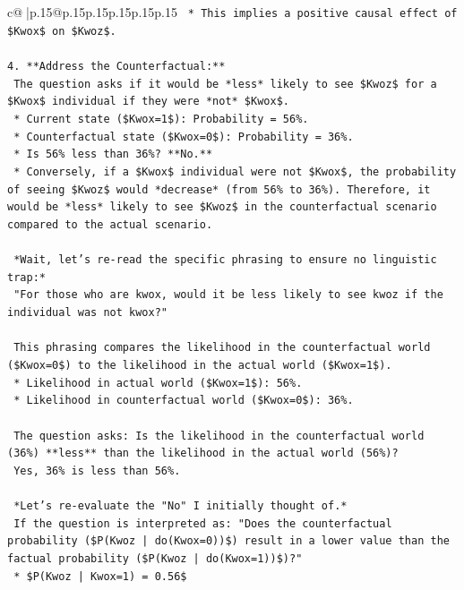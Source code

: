 \documentclass{article}
\begin{document}
{\begin{supertabular}{c@{$\;$}|p{.15\linewidth}@{}p{.15\linewidth}p{.15\linewidth}p{.15\linewidth}p{.15\linewidth}p{.15\linewidth}}
{{{\texttt{    *   This implies a positive causal effect of \$Kwox\$ on \$Kwoz\$.} \\
\\ 
\texttt{4.  **Address the Counterfactual:**} \\
\texttt{    The question asks if it would be *less* likely to see \$Kwoz\$ for a \$Kwox\$ individual if they were *not* \$Kwox\$.} \\
\texttt{    *   Current state (\$Kwox=1\$): Probability = 56\%.} \\
\texttt{    *   Counterfactual state (\$Kwox=0\$): Probability = 36\%.} \\
\texttt{    *   Is 56\% less than 36\%? **No.**} \\
\texttt{    *   Conversely, if a \$Kwox\$ individual were not \$Kwox\$, the probability of seeing \$Kwoz\$ would *decrease* (from 56\% to 36\%). Therefore, it would be *less* likely to see \$Kwoz\$ in the counterfactual scenario compared to the actual scenario.} \\
\\ 
\texttt{    *Wait, let's re{-}read the specific phrasing to ensure no linguistic trap:*} \\
\texttt{    "For those who are kwox, would it be less likely to see kwoz if the individual was not kwox?"} \\
\\ 
\texttt{    This phrasing compares the likelihood in the counterfactual world (\$Kwox=0\$) to the likelihood in the actual world (\$Kwox=1\$).} \\
\texttt{    *   Likelihood in actual world (\$Kwox=1\$): 56\%.} \\
\texttt{    *   Likelihood in counterfactual world (\$Kwox=0\$): 36\%.} \\
\\ 
\texttt{    The question asks: Is the likelihood in the counterfactual world (36\%) **less** than the likelihood in the actual world (56\%)?} \\
\texttt{    Yes, 36\% is less than 56\%.} \\
\\ 
\texttt{    *Let's re{-}evaluate the "No" I initially thought of.*} \\
\texttt{    If the question is interpreted as: "Does the counterfactual probability (\$P(Kwoz | do(Kwox=0))\$) result in a lower value than the factual probability (\$P(Kwoz | do(Kwox=1))\$)?"} \\
\texttt{    *   \$P(Kwoz | Kwox=1) = 0.56\$} \\
}}}
\end{supertabular}}
\end{document}

